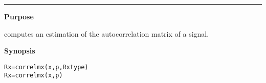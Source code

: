 \hspace*{-1.6cm}{\Large \bf correlmx}

\vspace*{-.4cm}
\hspace*{-1.6cm}\rule[0in]{16.5cm}{.02cm}
\vspace*{.2cm}

{\bf \large {}\selectfont Purpose}\\
\hspace*{1.5cm}
\begin{minipage}[t]{13.5cm}
computes an estimation of the autocorrelation matrix of a signal.
\end{minipage}
\vspace*{.2cm}

{\bf \large {}\selectfont Synopsis}\\
\hspace*{1.5cm}
\begin{minipage}[t]{13.5cm}
\begin{verbatim}
Rx=correlmx(x,p,Rxtype)
Rx=correlmx(x,p)
\end{verbatim}
\end{minipage}
\vspace*{.2cm}

